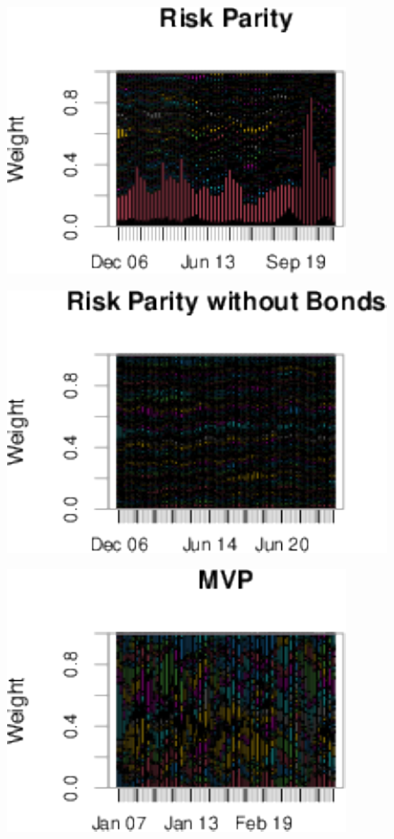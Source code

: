 \documentclass[11pt,preprint]{elsarticle}
\let\origfigure\figure
\let\endorigfigure\endfigure
\renewenvironment{figure}[1][2] {
    \expandafter\origfigure\expandafter[H]
} {
    \endorigfigure
}
\numberwithin{equation}{section}
\numberwithin{figure}{section}
\numberwithin{table}{section}
\begin{document}
\begin{figure}[H]

{\centering \includegraphics{Essay_files/figure-latex/Figure 4-1} 

}

\caption{Drawdowns \label{Figure4}}\label{fig:Figure 4-1}
\end{figure}
\begin{figure}[H]

{\centering \includegraphics{Essay_files/figure-latex/Figure 4-2} 

}

\caption{Drawdowns \label{Figure4}}\label{fig:Figure 4-2}
\end{figure}
\begin{figure}[H]

{\centering \includegraphics{Essay_files/figure-latex/Figure 4-3} 

}

\caption{Drawdowns \label{Figure4}}\label{fig:Figure 4-3}
\end{figure}
\end{document}
